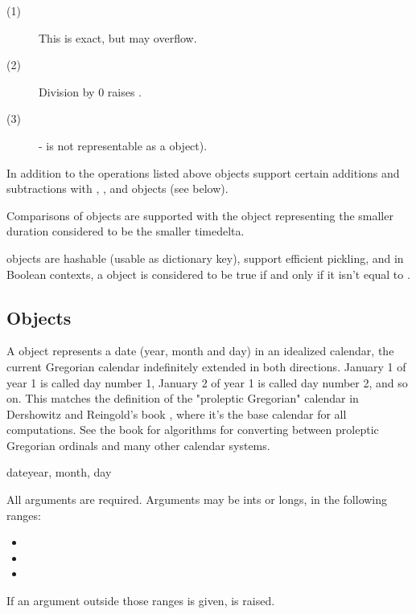 \begin{description}
\item[(1)]
This is exact, but may overflow.

\item[(2)]
Division by 0 raises .

\item[(3)]
- is not representable as a  object).

\end{description}

In addition to the operations listed above  objects
support certain additions and subtractions with ,
, and  objects (see below).

Comparisons of  objects are supported with the
 object representing the smaller duration considered
to be the smaller timedelta.

 objects are hashable (usable as dictionary key),
support efficient pickling, and in Boolean contexts, a 
object is considered to be true if and only if it isn't equal to
.


\subsection{ Objects \label{datetime-date}}

A  object represents a date (year, month and day) in an idealized
calendar, the current Gregorian calendar indefinitely extended in both
directions.  January 1 of year 1 is called day number 1, January 2 of year
1 is called day number 2, and so on.  This matches the definition of the
"proleptic Gregorian" calendar in Dershowitz and Reingold's book
, where it's the base calendar for all
computations.  See the book for algorithms for converting between
proleptic Gregorian ordinals and many other calendar systems.

\begin{funcdesc}{date}{year, month, day}

    All arguments are required.  Arguments may be ints or longs, in the
    following ranges:

\begin{itemize}
  \item {}
  \item {}
  \item {}
\end{itemize}

If an argument outside those ranges is given, 
is raised.
\end{funcdesc}

